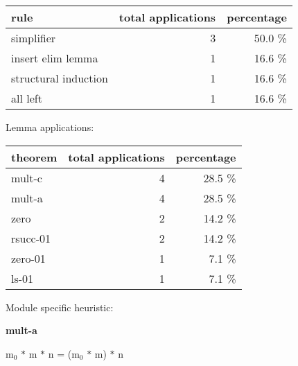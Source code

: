 \documentclass[a4paper]{article}
\begin{document}
\begin{supertabular}{l|r|r}
rule	        & total applications & percentage \\ \hline
simplifier & 3 & 50.0 \% \\
insert elim lemma & 1 & 16.6 \% \\
structural induction & 1 & 16.6 \% \\
all left & 1 & 16.6 \% \\

\end{supertabular}

Lemma applications:

\begin{supertabular}{l|r|r}
theorem	        & total applications & percentage \\ \hline
mult-c & 4 & 28.5 \% \\
mult-a & 4 & 28.5 \% \\
zero & 2 & 14.2 \% \\
rsucc-01 & 2 & 14.2 \% \\
zero-01 & 1 & 7.1 \% \\
ls-01 & 1 & 7.1 \% \\

\end{supertabular}

Module specific heuristic:

\pagebreak

{\LARGE\bf mult-a}\label{lemma-mult-a}

\medskip

 \Fol $\mbox{m}_{0}$ $*$ m $*$ n = ($\mbox{m}_{0}$ $*$ m) $*$ n
\end{document}
